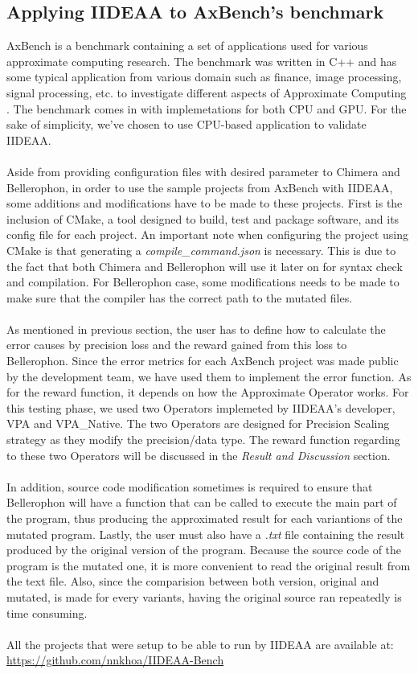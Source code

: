 \subsection{Applying IIDEAA to AxBench's benchmark}

AxBench is a benchmark containing a set of applications used for various approximate computing research. The benchmark was written in C++ and has some typical application from various domain such as finance, image processing, signal processing, etc. to investigate different aspects of Approximate Computing \cite{7755728}. The benchmark comes in with implemetations for both CPU and GPU. For the sake of simplicity, we've chosen to use CPU-based application to validate IIDEAA. \\
~\\
Aside from providing configuration files with desired parameter to Chimera and Bellerophon, in order to use the sample projects from AxBench with IIDEAA, some additions and modifications have to be made to these projects. First is the inclusion of CMake, a tool designed to build, test and package software, and its config file for each project. An important note when configuring the project using CMake is that generating a \textit{compile\_command.json} is necessary. This is due to the fact that both Chimera and Bellerophon will use it later on for syntax check and compilation. For Bellerophon case, some modifications needs to be made to make sure that the compiler has the correct path to the mutated files. \\
~\\
As mentioned in previous section, the user has to define how to calculate the error causes by precision loss and the reward gained from this loss to Bellerophon. Since the error metrics for each AxBench project was made public by the development team, we have used them to implement the error function. As for the reward function, it depends on how the Approximate Operator works. For this testing phase, we used two Operators implemeted by IIDEAA's developer, VPA and VPA\_Native. The two Operators are designed for Precision Scaling strategy as they modify the precision/data type. The reward function regarding to these two Operators will be discussed in the \textit{Result and Discussion} section. \\
~\\
In addition, source code modification sometimes is required to ensure that Bellerophon will have a function that can be called to execute the main part of the program, thus producing the approximated result for each variantions of the mutated program. Lastly, the user must also have a \textit{.txt} file containing the result produced by the original version of the program. Because the source code of the program is the mutated one, it is more convenient to read the original result from the text file. Also, since the comparision between both version, original and mutated, is made for every variants, having the original source ran repeatedly is time consuming. \\
~\\
All the projects that were setup to be able to run by IIDEAA are available at: \url{https://github.com/nnkhoa/IIDEAA-Bench} \\

